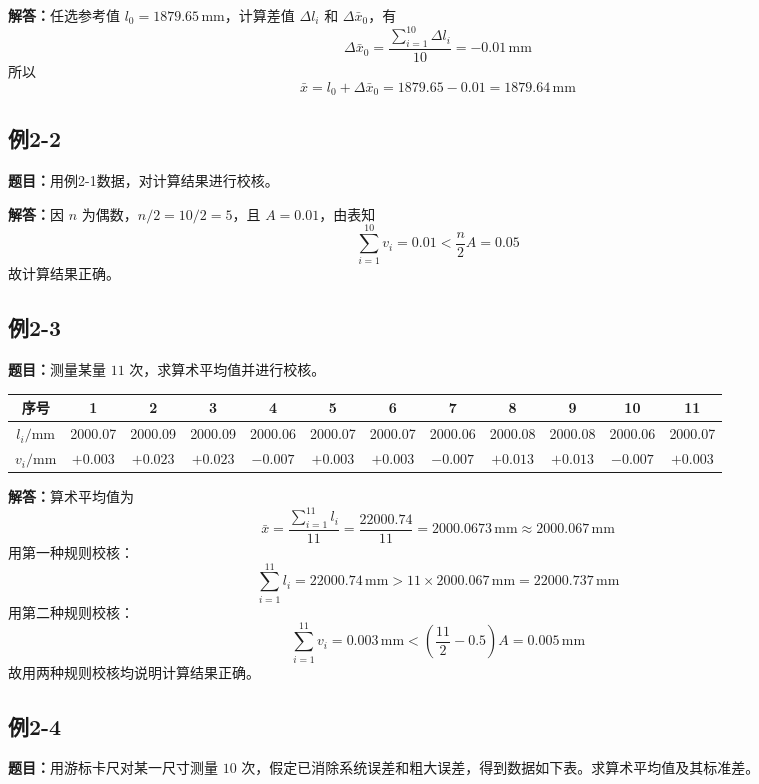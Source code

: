 \documentclass[UTF8,zihao=-4]{ctexart}
\newcommand{\problem}[1]{\subsection*{#1}}
\newcommand{\timu}{\noindent\textbf{题目：}}
\newcommand{\jieda}{\noindent\textbf{解答：}}
\begin{document}
\jieda 任选参考值 $l_0=1879.65\,\mathrm{mm}$，计算差值 $\Delta l_i$ 和 $\Delta\bar{x}_0$，有
\begin{equation*}
    \Delta\bar{x}_0=\frac{\sum_{i=1}^{10}\Delta l_i}{10}=-0.01\,\mathrm{mm}
\end{equation*}
所以
\begin{equation*}
    \bar{x}=l_0+\Delta\bar{x}_0=1879.65-0.01=1879.64\,\mathrm{mm}
\end{equation*}

\problem{例2-2}
\timu 用例2-1数据，对计算结果进行校核。

\jieda 因 $n$ 为偶数，$n/2=10/2=5$，且 $A=0.01$，由表知
\begin{equation*}
    \sum_{i=1}^{10}v_i=0.01<\frac{n}{2}A=0.05
\end{equation*}
故计算结果正确。

\problem{例2-3}
\timu 测量某量 $11$ 次，求算术平均值并进行校核。

\begin{center}
\scriptsize
\setlength{\tabcolsep}{7pt}
\begin{tabular}{c|ccccccccccc}
\toprule
序号 & 1 & 2 & 3 & 4 & 5 & 6 & 7 & 8 & 9 & 10 & 11\\
\midrule
$l_i/\mathrm{mm}$ & 2000.07 & 2000.09 & 2000.09 & 2000.06 & 2000.07 & 2000.07 & 2000.06 & 2000.08 & 2000.08 & 2000.06 & 2000.07\\
$v_i/\mathrm{mm}$ & $+0.003$ & $+0.023$ & $+0.023$ & $-0.007$ & $+0.003$ & $+0.003$ & $-0.007$ & $+0.013$ & $+0.013$ & $-0.007$ & $+0.003$\\
\bottomrule
\end{tabular}
\end{center}

\jieda 算术平均值为
\begin{equation*}
    \bar{x}=\frac{\sum_{i=1}^{11}l_i}{11}=\frac{22000.74}{11}=2000.0673\,\mathrm{mm}\approx2000.067\,\mathrm{mm}
\end{equation*}
用第一种规则校核：
\begin{equation*}
    \sum_{i=1}^{11}l_i=22000.74\,\mathrm{mm}>11\times2000.067\,\mathrm{mm}=22000.737\,\mathrm{mm}
\end{equation*}
用第二种规则校核：
\begin{equation*}
    \sum_{i=1}^{11}v_i=0.003\,\mathrm{mm}<\left(\frac{11}{2}-0.5\right)A=0.005\,\mathrm{mm}
\end{equation*}
故用两种规则校核均说明计算结果正确。

\problem{例2-4}
\timu 用游标卡尺对某一尺寸测量 $10$ 次，假定已消除系统误差和粗大误差，得到数据如下表。求算术平均值及其标准差。
\end{document}

